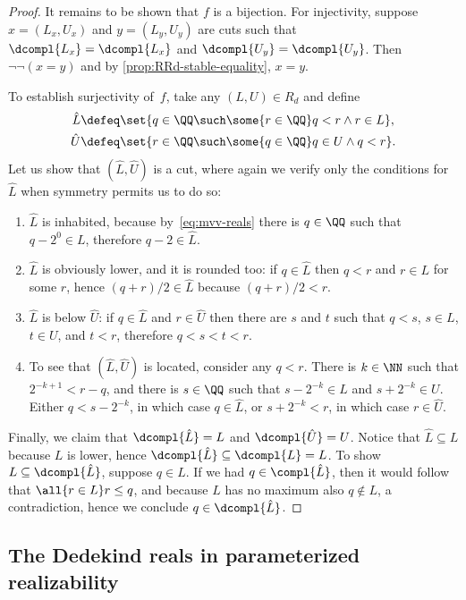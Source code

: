 \begin{proof}
  It remains to be shown that $f$ is a bijection. For injectivity, suppose $x = (L_x, U_x)$ and $y = (L_y, U_y)$ are cuts such that $\dcompl{L_x} = \dcompl{L_x}$ and $\dcompl{U_y} = \dcompl{U_y}$. Then $\lnot\lnot (x = y)$ and by 
  \cref{prop:RRd-stable-equality}, $x = y$.

  To establish surjectivity of~$f$, take any $(L, U) \in R_d$ and define
  \begin{align*}
    \hat{L} &\defeq \set{q \in \QQ \such \some{r \in \QQ} q < r \land r \in L},
    \\
    \hat{U} &\defeq \set{r \in \QQ \such \some{q \in \QQ} q \in U \land q < r}.
  \end{align*}
  Let us show that $(\hat{L}, \hat{U})$ is a cut, where again we verify only the conditions for~$\hat{L}$ when symmetry permits us to do so:
  \begin{enumerate}
  \item $\hat{L}$ is inhabited, because by~\eqref{eq:mvv-reals} there is $q \in \QQ$ such that $q - 2^{0} \in L$, therefore $q - 2 \in \hat{L}$.
  \item $\hat{L}$ is obviously lower, and it is rounded too: if $q \in \hat{L}$ then $q < r$ and $r \in L$ for some $r$,
    hence $(q + r)/2 \in \hat{L}$ because $(q + r)/2 < r$.
  \item $\hat{L}$ is below $\hat{U}$: if $q \in \hat{L}$ and $r \in \hat{U}$ then there are $s$ and $t$ such that $q < s$, $s \in L$, $t \in U$, and $t < r$, therefore $q < s < t < r$.
  \item To see that $(\hat{L},  \hat{U})$ is located, consider any $q < r$. There is $k \in \NN$ such that $2^{-k+1} < r - q$, and there is $s \in \QQ$ such that $s - 2^{-k} \in L$ and $s + 2^{-k} \in U$. Either $q < s - 2^{-k}$, in which case $q \in \hat{L}$, or $s + 2^{-k} < r$, in which case $r \in \hat{U}$.
  \end{enumerate}
  Finally, we claim that $\dcompl{\hat{L}} = L$ and $\dcompl{\hat{U}} = U$.
  Notice that $\hat{L} \subseteq L$ because $L$ is lower, hence $\dcompl{\hat{L}} \subseteq \dcompl{L} = L$.
  To show $L \subseteq \dcompl{\hat{L}}$, suppose $q \in L$. If we had $q \in \compl{\hat{L}}$, then it would follow that $\all{r \in L} r \leq q$, and because $L$ has no maximum also $q \not\in L$, a contradiction, hence we conclude $q \in \dcompl{\hat{L}}$.
\end{proof}

\subsection{The Dedekind reals in parameterized realizability}
\label{sec:dedek-reals-param}

